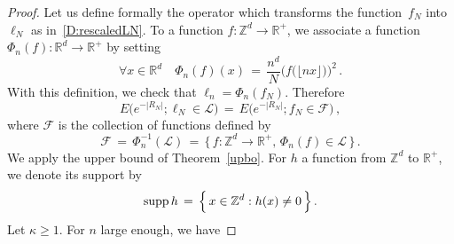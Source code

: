\documentclass[10pt]{amsart}
\theoremstyle{definition}\newtheorem{defi}[theo]{Definition}\newtheorem{rema}[theo]{Remark}\newtheorem{exam}[theo]{Example}\newtheorem{exem}[theo]{Example}\newtheorem{nota}[theo]{Notation}
\newcommand*\supp{\text{supp\,}}
\newcommand*\Zd {{\mathbb Z^d}}
\newcommand*\Rd {{\mathbb R^d}}
\newcommand*\R{\mathbb{R}}
\newcommand{\cF}{\mathcal{F}}
\newcommand{\cL}{\mathcal{L}}
\let\oldforall\forall
\renewcommand*{\forall}{\mathrel{\oldforall}}
\begin{document}
\begin{proof}
Let us define formally the operator which transforms the function~$f_N$ into $\ell_N$ as in~\eqref{D:rescaledLN}. To a function $f:\Zd\to\R^+$, we associate a function $\Phi_n(f):\Rd\to\R^+$ by setting
\begin{equation}\label{E:rescale_op}
\forall x\in\Rd\quad \Phi_n(f)(x)\,=\,
\frac{n^d}{N}{\Big(f\big(\lfloor nx\rfloor\big)\Big)^2}\,.
\end{equation}
With this definition, we check that $\ell_n=\Phi_n(f_N)$. Therefore
\[
E\Big(e^{-|R_N|};
\ell_N\in\cL\Big)\,=\, E\Big(e^{-|R_N|}; f_N\in\cF\Big)\,,
\]
where $\cF$ is the collection of functions defined by
\[
\cF\,=\,
\Phi_n^{-1}(\cL)
\,=\,
\big\{\,f:\Zd\to\R^+, \,\Phi_n(f)\in\cL\,\big\}\,.
\]
We apply the upper bound of Theorem~\ref{upbo}. For $h$ a function from $\Zd$ to $\R^+$, we denote its support by
\[
\supp h\,=\,
\Big\{\,x\in \Zd: h(x)\neq 0
\,\Big\}\,.
\]
Let $\kappa\geq 1$. For $n$ large enough, we have


\end{proof}
\end{document}
